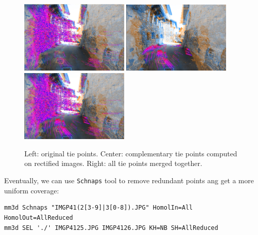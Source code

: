 \begin{figure}[!h]
	\begin{center}
		\includegraphics[width=52mm]{FIGS/StreetSainMartin/rect2.jpg}
		\includegraphics[width=52mm]{FIGS/StreetSainMartin/rect1.jpg}
		\includegraphics[width=52mm]{FIGS/StreetSainMartin/rect3.jpg}
		\caption{Left: original tie points. Center: complementary tie points computed on rectified images. Right: all tie points merged together.}
	\end{center}	
\end{figure}

\noindent Eventually, we can use \texttt{Schnaps} tool to remove redundant points ang get a more uniform coverage: \newline

\begin{verbatim}
mm3d Schnaps "IMGP41(2[3-9]|3[0-8]).JPG" HomolIn=All HomolOut=AllReduced
mm3d SEL './' IMGP4125.JPG IMGP4126.JPG KH=NB SH=AllReduced
\end{verbatim} 

